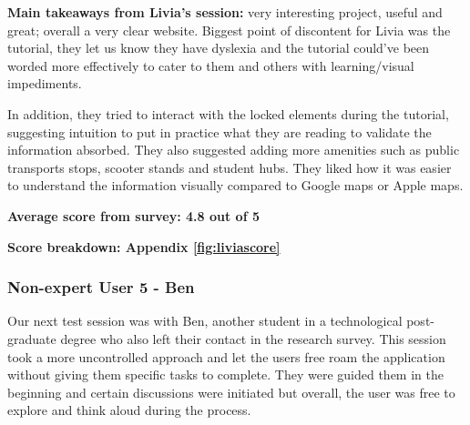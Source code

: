 \textbf{Main takeaways from Livia's session: }very interesting project,
useful and great; overall a very clear website. Biggest point of discontent for
Livia was the tutorial, they let us know they have dyslexia and the tutorial
could've been worded more effectively to cater to them and others with
learning/visual impediments.

In addition, they tried to interact with the locked elements during the
tutorial, suggesting intuition to put in practice what they are reading to
validate the information absorbed. They also suggested adding more amenities
such as public transports stops, scooter stands and student hubs. They liked how
it was easier to understand the information visually compared to Google maps or
Apple maps.

\textbf{Average score from survey: 4.8 out of 5}

\hspace{2em}\textbf{Score breakdown: Appendix \ref{fig:liviascore}}

\newpage{}

\subsubsection{Non-expert User 5 - Ben}
Our next test session was with Ben, another student in a technological
post-graduate degree who also left their contact in the research survey. This
session took a more uncontrolled approach and let the users free roam the
application without giving them specific tasks to complete. They were guided
them in the beginning and certain discussions were initiated but overall, the
user was free to explore and think aloud during the process.


